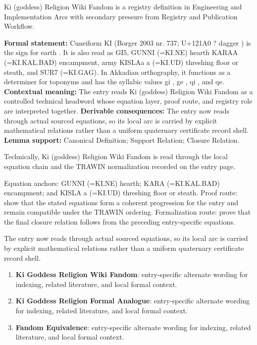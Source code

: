 
\begingroup\small
{}
Ki (goddess) Religion Wiki Fandom is a registry definition in Engineering and Implementation Arcs with secondary pressure from Registry and Publication Workflow.

\begingroup\footnotesize\setlength{\emergencystretch}{3em}\sloppy
\textbf{Formal statement:} Cuneiform KI (Borger 2003 nr. 737; U+121A0 ? dagger ) is the sign for earth . It is also read as GI5, GUNNI (=KI.NE) hearth KARAA (=KI.KAL.BAD) encampment, army KISLAa a (=KI.UD) threshing floor or steath, and SUR7 (=KI.GAG). In Akkadian orthography, it functions as a determiner for toponyms and has the syllabic values gi , ge , qi , and qe. \textbf{Contextual meaning:} The entry reads Ki (goddess) Religion Wiki Fandom as a controlled technical headword whose equation layer, proof route, and registry role are interpreted together. \textbf{Derivable consequences:} The entry now reads through actual sourced equations, so its local arc is carried by explicit mathematical relations rather than a uniform quaternary certificate record shell. \textbf{Lemma support:} Canonical Definition; Support Relation; Closure Relation.\par
\endgroup

Technically, Ki (goddess) Religion Wiki Fandom is read through the local equation chain and the TRAWIN normalization recorded on the entry page.

Equation anchors: GUNNI (=KI.NE) hearth; KARA  (=KI.KAL.BAD) encampment; and KISLA   a (=KI.UD) threshing floor or steath. Proof route: show that the stated equations form a coherent progression for the entry and remain compatible under the TRAWIN ordering. Formalization route: prove that the final closure relation follows from the preceding entry-specific equations.

The entry now reads through actual sourced equations, so its local arc is carried by explicit mathematical relations rather than a uniform quaternary certificate record shell.
\endgroup

\begin{enumerate}[leftmargin=1.6em,itemsep=6pt,topsep=4pt]
\item \textbf{Ki Goddess Religion Wiki Fandom}: entry-specific alternate wording for indexing, related literature, and local formal context.
\item \textbf{Ki Goddess Religion Formal Analogue}: entry-specific alternate wording for indexing, related literature, and local formal context.
\item \textbf{Fandom Equivalence}: entry-specific alternate wording for indexing, related literature, and local formal context.
\end{enumerate}

